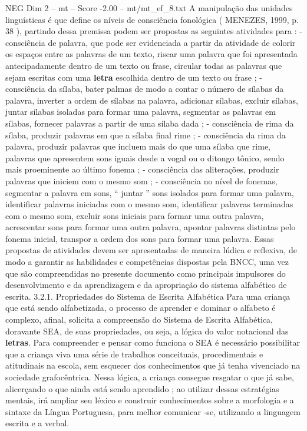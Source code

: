 \begin{textsample}{NEG Dim 2 – mt – Score -2.00 – mt/mt\_ef\_8.txt}
A manipulação das unidades linguísticas é que define os níveis de consciência fonológica ( MENEZES, 1999, p. 38 ), partindo dessa premissa podem ser propostas as seguintes atividades para : - consciência de palavra, que pode ser evidenciada a partir da atividade de colorir os espaços entre as palavras de um texto, riscar uma palavra que foi apresentada antecipadamente dentro de um texto ou frase, circular todas as palavras que sejam escritas com uma \textbf{letra} escolhida dentro de um texto ou frase ; - consciência da sílaba, bater palmas de modo a contar o número de sílabas da palavra, inverter a ordem de sílabas na palavra, adicionar sílabas, excluir sílabas, juntar sílabas isoladas para formar uma palavra, segmentar as palavras em sílabas, fornecer palavras a partir de uma sílaba dada ; - consciência de rima da sílaba, produzir palavras em que a sílaba final rime ; - consciência da rima da palavra, produzir palavras que incluem mais do que uma sílaba que rime, palavras que apresentem sons iguais desde a vogal ou o ditongo tônico, sendo mais proeminente ao último fonema ; - consciência das aliterações, produzir palavras que iniciem com o mesmo som ; - consciência no nível de fonemas, segmentar a palavra em sons, “ juntar ” sons isolados para formar uma palavra, identificar palavras iniciadas com o mesmo som, identificar palavras terminadas com o mesmo som, excluir sons iniciais para formar uma outra palavra, acrescentar sons para formar uma outra palavra, apontar palavras distintas pelo fonema inicial, transpor a ordem dos sons para formar uma palavra.
Essas propostas de atividades devem ser apresentadas de maneira lúdica e reflexiva, de modo a garantir as habilidades e competências dispostas pela BNCC, uma vez que são compreendidas no presente documento como principais impulsores do desenvolvimento e da aprendizagem e da apropriação do sistema alfabético de escrita. 3.2.1.
Propriedades do Sistema de Escrita Alfabética Para uma criança que está sendo alfabetizada, o processo de aprender e dominar o alfabeto é complexo, afinal, solicita a compreensão do Sistema de Escrita Alfabética, doravante SEA, de suas propriedades, ou seja, a lógica do valor notacional das \textbf{letras}.
Para compreender e pensar como funciona o SEA é necessário possibilitar que a criança viva uma série de trabalhos conceituais, procedimentais e atitudinais na escola, sem esquecer dos conhecimentos que já tenha vivenciado na sociedade grafocêntrica.
Nessa lógica, a criança consegue resgatar o que já sabe, alicerçando o que ainda está sendo aprendido ; ao utilizar dessas estratégias mentais, irá ampliar seu léxico e construir conhecimentos sobre a morfologia e a sintaxe da Língua Portuguesa, para melhor comunicar -se, utilizando a linguagem escrita e a verbal.

\end{textsample}
